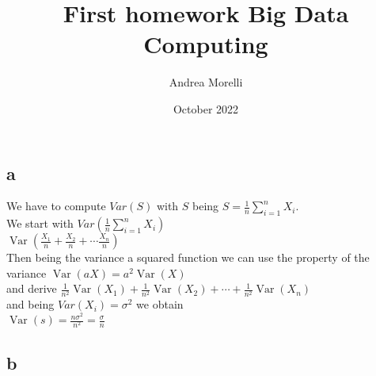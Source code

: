 \documentclass{article}
\title{First homework Big Data Computing}
\author{Andrea Morelli}
\date{October 2022}
\begin{document}
\maketitle

\section{}

\section{}
\subsection{a}
We have to compute $Var(S)$ with $S$ being 
$S=\frac{1}{n} \sum_{i=1}^n X_i$.\\
We start with $Var(\frac{1}{n} \sum_{i=1}^n X_i)$\\
$
\operatorname{Var}\left(\frac{X_1}{n}+\frac{X_2}{n}+\cdots \frac{X_n}{n}\right)
$\\
Then being the variance a squared function we can use the property of the variance $\operatorname{Var}(a X)=a^2 \operatorname{Var}(X)$\\
and derive $\frac{1}{n^2} \operatorname{Var}\left(X_1\right)+\frac{1}{n^2} \operatorname{Var}\left(X_2\right)+\cdots+\frac{1}{n^2} \operatorname{Var}\left(X_n\right)$\\
and being $Var(X_i)=\sigma^2$ we obtain\\
$\operatorname{Var}(s)=\frac{n \sigma^2}{n^2}=\frac{\sigma}{n}$


\subsection{b}
\end{document}
